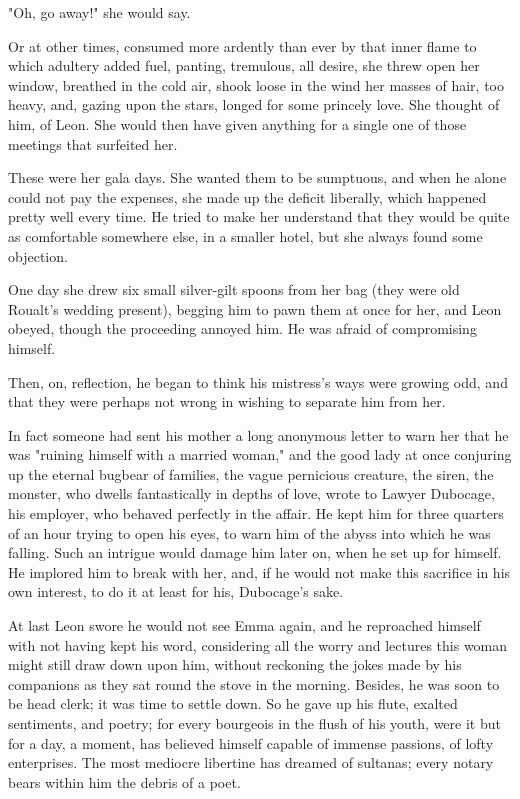 \documentclass[11pt,twocolumn]{ltugboat}
\begin{document}
"Oh, go away!" she would say.

Or at other times, consumed more ardently than ever by that inner flame
to which adultery added fuel, panting, tremulous, all desire, she threw
open her window, breathed in the cold air, shook loose in the wind her
masses of hair, too heavy, and, gazing upon the stars, longed for some
princely love. She thought of him, of Leon. She would then have given
anything for a single one of those meetings that surfeited her.

These were her gala days. She wanted them to be sumptuous, and when he
alone could not pay the expenses, she made up the deficit liberally,
which happened pretty well every time. He tried to make her understand
that they would be quite as comfortable somewhere else, in a smaller
hotel, but she always found some objection.

One day she drew six small silver-gilt spoons from her bag (they were
old Roualt's wedding present), begging him to pawn them at once for her,
and Leon obeyed, though the proceeding annoyed him. He was afraid of
compromising himself.

Then, on, reflection, he began to think his mistress's ways were growing
odd, and that they were perhaps not wrong in wishing to separate him
from her.

In fact someone had sent his mother a long anonymous letter to warn her
that he was "ruining himself with a married woman," and the good lady at
once conjuring up the eternal bugbear of families, the vague pernicious
creature, the siren, the monster, who dwells fantastically in depths of
love, wrote to Lawyer Dubocage, his employer, who behaved perfectly in
the affair. He kept him for three quarters of an hour trying to open
his eyes, to warn him of the abyss into which he was falling. Such
an intrigue would damage him later on, when he set up for himself. He
implored him to break with her, and, if he would not make this sacrifice
in his own interest, to do it at least for his, Dubocage's sake.

At last Leon swore he would not see Emma again, and he reproached
himself with not having kept his word, considering all the worry and
lectures this woman might still draw down upon him, without reckoning
the jokes made by his companions as they sat round the stove in the
morning. Besides, he was soon to be head clerk; it was time to settle
down. So he gave up his flute, exalted sentiments, and poetry; for every
bourgeois in the flush of his youth, were it but for a day, a moment,
has believed himself capable of immense passions, of lofty enterprises.
The most mediocre libertine has dreamed of sultanas; every notary bears
within him the debris of a poet.
\end{document}
